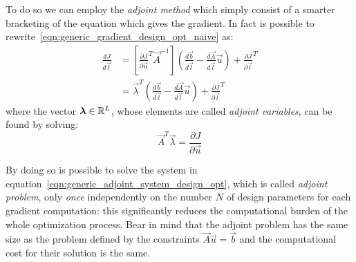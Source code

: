 \smallskip
To do so we can employ the \emph{adjoint method} which simply consist of a smarter bracketing of the equation which gives the gradient. In fact is possible to rewrite~\eqref{eqn:generic_gradient_design_opt_naive} as:
\begin{equation}
	\begin{aligned}
		\frac{dJ}{d\vec{l}} & = \left[ \frac{\partial J}{\partial \vec{u}}^T \vec{A}^{-1} \right] \left( \frac{d\vec{b}}{d\vec{l}} - \frac{d\vec{A}}{d\vec{l}}\vec{u} \right) + \frac{\partial J}{\partial \vec{l}}^T  \\[2ex]
							& = \vec{\lambda}^T \left( \frac{d\vec{b}}{d\vec{l}} - \frac{d\vec{A}}{d\vec{l}}\vec{u} \right) + \frac{\partial J}{\partial \vec{l}}^T
	\end{aligned}
\end{equation}
where the vector $\boldsymbol{\lambda} \in \mathbb{R}^L$, whose elements are called \emph{adjoint variables}, can be found by solving:
\begin{equation}
	\label{eqn:generic_adjoint_system_design_opt}
	\vec{A}^T \vec{\lambda} = \frac{\partial J}{\partial \vec{u}}
\end{equation}

By doing so is possible to solve the system in equation~\eqref{eqn:generic_adjoint_system_design_opt}, which is called \emph{adjoint problem}, only \emph{once} independently on the number $N$ of design parameters for each gradient computation: this significantly reduces the computational burden of the whole optimization process. Bear in mind that the adjoint problem has the same size as the problem defined by the constraints $\vec{A} \vec{u} = \vec{b}$ and the computational cost for their solution is the same.

